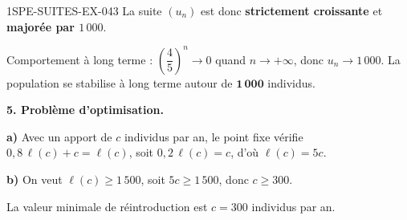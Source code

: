 \begin{corrige}{1SPE-SUITES-EX-043}
La suite $(u_n)$ est donc \textbf{strictement croissante} et \textbf{majorée par $1\,000$}.

Comportement à long terme : $\left(\dfrac{4}{5}\right)^n \to 0$ quand $n \to +\infty$, donc $u_n \to 1\,000$. La population se stabilise à long terme autour de $\mathbf{1\,000}$ individus.

\textbf{5. Problème d'optimisation.}

\textbf{a)} Avec un apport de $c$ individus par an, le point fixe vérifie $0{,}8\,\ell(c) + c = \ell(c)$, soit $0{,}2\,\ell(c) = c$, d'où $\ell(c) = 5c$.

\textbf{b)} On veut $\ell(c) \geq 1\,500$, soit $5c \geq 1\,500$, donc $c \geq 300$.

La valeur minimale de réintroduction est $\boxed{c = 300}$ individus par an.

\end{corrige}
